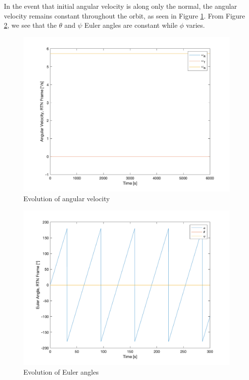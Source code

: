 In the event that initial angular velocity is along only the normal, the angular velocity remains constant throughout the orbit, as seen in Figure \ref{fig:ps4_problem1b_angvel}. From Figure \ref{fig:ps4_problem1b_euler}, we see that the $\theta$ and $\psi$ Euler angles are constant while $\phi$ varies.

\begin{figure}[H]
\centering
\includegraphics[scale=0.6]{Images/ps4_problem1b_angvel.png}
\caption{Evolution of angular velocity}
\label{fig:ps4_problem1b_angvel}
\end{figure}

\begin{figure}[H]
\centering
\includegraphics[scale=0.6]{Images/ps4_problem1b_euler.png}
\caption{Evolution of Euler angles}
\label{fig:ps4_problem1b_euler}
\end{figure}


